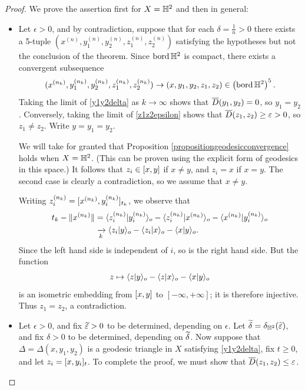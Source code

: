 \begin{proof}
We prove the assertion first for $X = \H^2$ and then in general:
\begin{itemize}
\item[If $X = \H^2$:] Let $\epsilon > 0$, and by contradiction, suppose that for each $\delta = \frac 1n > 0$ there exists a 5-tuple $(x^{(n)},y_1^{(n)},y_2^{(n)},z_1^{(n)},z_2^{(n)})$ satisfying the hypotheses but not the conclusion of the theorem. Since $\bord\H^2$ is compact, there exists a convergent subsequence
\[
(x^{(n_k)},y_1^{(n_k)},y_2^{(n_k)},z_1^{(n_k)},z_2^{(n_k)}) \to (x,y_1,y_2,z_1,z_2)\in\left(\bord\H^2\right)^5.
\]
Taking the limit of \eqref{y1y2delta} as $k\to\infty$ shows that $\overline{D}(y_1,y_2) = 0$, so $y_1 = y_2$. Conversely, taking the limit of \eqref{z1z2epsilon} shows that $\overline{D}(z_1,z_2) \geq \varepsilon > 0$, so $z_1\neq z_2$. Write $y = y_1 = y_2$.

We will take for granted that Proposition \ref{propositiongeodesicconvergence} holds when $X = \H^2$. (This can be proven using the explicit form of geodesics in this space.) It follows that $z_i\in [x,y]$ if $x\neq y$, and $z_i = x$ if $x = y$. The second case is clearly a contradiction, so we assume that $x\neq y$.

Writing $z_i^{(n_k)} = [x^{(n_k)},y_i^{(n_k)}]_{t_k}$, we observe that
\begin{align*}
t_k - \|x^{(n_k)}\|
&= \langle z_i^{(n_k)} | y_i^{(n_k)} \rangle_o - \langle z_i^{(n_k)} | x^{(n_k)} \rangle_o - \langle x^{(n_k)} | y_i^{(n_k)} \rangle_o\\
&\xrightarrow[k]{} \langle z_i | y \rangle_o - \langle z_i | x \rangle_o - \langle x |y\rangle_o.
\end{align*}
Since the left hand side is independent of $i$, so is the right hand side. But the function
\[
z\mapsto \langle z | y \rangle_o - \langle z | x \rangle_o - \langle x | y \rangle_o
\]
is an isometric embedding from $[x,y]$ to $[-\infty,+\infty]$; it is therefore injective. Thus $z_1 = z_2$, a contradiction.

\item[In general:] Let $\epsilon > 0$, and fix $\widetilde{\varepsilon} > 0$ to be determined, depending on $\epsilon$. Let $\w\delta = \delta_{\H^2}(\w\epsilon)$, and fix $\delta > 0$ to be determined, depending on $\widetilde\delta$. Now suppose that $\Delta = \Delta(x,y_1,y_2)$ is a geodesic triangle in $X$ satisfying \eqref{y1y2delta}, fix $t\geq 0$, and let $z_i = [x,y_i]_t$. To complete the proof, we must show that $\overline{D}(z_1,z_2) \leq \varepsilon$.


\end{itemize}
\end{proof}
